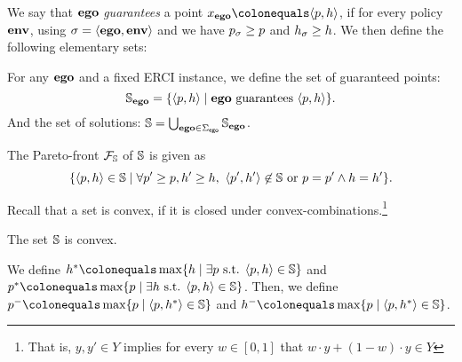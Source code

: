 {{{{We say that $\mathbf{ego}$ \emph{guarantees} a point $x_\pOneSched \colonequals \langle \scp, \rndp \rangle$, if for every policy $\mathbf{env}$, using $\sigma = \langle \mathbf{ego}, \mathbf{env} \rangle$ and we have $p_\sigma \geq p$ and $h_\sigma \geq h$.
We then define the following elementary sets:
\begin{definition}[Solutions]
For any $\mathbf{ego}$ and a fixed ERCI instance, we define the set of guaranteed points:
  \[ \mathbb{S}_{\mathbf{ego}} = \{ \langle p, h \rangle \mid  \mathbf{ego} \text{ guarantees } \langle p, h \rangle \}. \]
And the set of solutions:    	
 $ \mathbb{S} = \bigcup_{\mathbf{ego} \in \Sigma_{\mathsf{ego}}} \mathbb{S}_{\mathbf{ego}}$.
\end{definition}
The Pareto-front $\mathcal{F}_{\mathbb{S}}$ of $\mathbb{S}$ is given as \[ \{ \langle p, h \rangle \in \mathbb{S} \mid \forall p' \geq p, h' \geq h, \ \langle p', h' \rangle \not\in \mathbb{S} \text{ or } p = p' \land  h = h'  \}. \]

\begin{example}
	
\end{example}

Recall that a set is convex, if it is closed under convex-combinations.\footnote{That is, $y, y' \in Y$ implies for every $w \in [0,1]$ that $w \cdot y + (1-w) \cdot y \in Y$}
\begin{proposition}
	The set $\mathbb{S}$ is convex. 
\end{proposition}

\begin{definition}
We define 
$\rndopt \colonequals \max \{ \rndp \mid \exists \scp \text{ s.t. } \langle \scp, \rndp \rangle \in \solutions  \} $
and 
$\scopt \colonequals \max \{ \scp \mid \exists \rndp \text{ s.t. } \langle \scp, \rndp \rangle \in \solutions  \} $.
Then, we define 
$\scmin \colonequals \max \{ \scp \mid \langle \scp, \rndopt \rangle  \in \solutions \}$ and $\rndmin \colonequals \max \{ \scp \mid \langle \scp, \rndopt \rangle  \in \solutions \}$.
\end{definition}





}}}}
